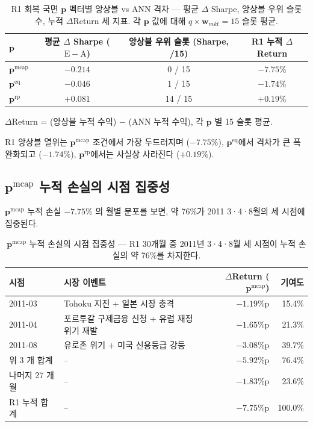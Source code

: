 \documentclass{article}
\begin{document}
\begin{table}[ht]
\centering
\caption{R1 회복 국면 $\mathbf{p}$ 벡터별 앙상블 vs ANN 격차 — 평균 $\Delta$ Sharpe,
앙상블 우위 슬롯 수, 누적 $\Delta$Return 세 지표.
각 $\mathbf{p}$ 값에 대해 $q \times \mathbf{w}_{mkt} = 15$ 슬롯 평균.}
\label{tab:r1_pmatrix_delta}
\setlength{\tabcolsep}{8pt}
\renewcommand{\arraystretch}{1.2}
\small
\begin{tabular}{lccc}
\toprule
$\mathbf{p}$ & 평균 $\Delta$ Sharpe ($\mathrm{E} - \mathrm{A}$) & 앙상블 우위 슬롯 (Sharpe, /15) & R1 누적 $\Delta$Return \\
\midrule
$\mathbf{p}^{\mathrm{mcap}}$ & $-0.214$ & 0 / 15  & $-7.75\%$ \\
$\mathbf{p}^{\mathrm{eq}}$   & $-0.046$ & 1 / 15  & $-1.74\%$ \\
$\mathbf{p}^{\mathrm{rp}}$   & $+0.081$ & 14 / 15 & $+0.19\%$ \\
\bottomrule
\end{tabular}
\par\smallskip
\footnotesize
\raggedright
$\Delta$Return = (앙상블 누적 수익) $-$ (ANN 누적 수익), 각 $\mathbf{p}$ 별 15 슬롯 평균.
\end{table}

R1 앙상블 열위는 $\mathbf{p}^{\mathrm{mcap}}$ 조건에서 가장 두드러지며 ($-7.75\%$), $\mathbf{p}^{\mathrm{eq}}$에서 격차가 큰 폭 완화되고 ($-1.74\%$), $\mathbf{p}^{\mathrm{rp}}$에서는 사실상 사라진다 ($+0.19\%$).

\subsection{$\mathbf{p}^{\mathrm{mcap}}$ 누적 손실의 시점 집중성}

$\mathbf{p}^{\mathrm{mcap}}$ 누적 손실 $-7.75\%$ 의 월별 분포를 보면, 약 76\%가 2011  3·4·8월의 세 시점에 집중된다.

\begin{table}[ht]
\centering
\caption{$\mathbf{p}^{\mathrm{mcap}}$ 누적 손실의 시점 집중성 — R1 30개월 중
2011년 3·4·8월 세 시점이 누적 손실의 약 76\%를 차지한다.}
\label{tab:r1_loss_concentration}
\setlength{\tabcolsep}{8pt}
\renewcommand{\arraystretch}{1.2}
\small
\begin{tabular}{llrr}
\toprule
시점 & 시장 이벤트 & $\Delta$Return ($\mathbf{p}^{\mathrm{mcap}}$) & 기여도 \\
\midrule
2011-03 & Tohoku 지진 + 일본 시장 충격              & $-1.19$\%p & 15.4\% \\
2011-04 & 포르투갈 구제금융 신청 + 유럽 재정위기 재발 & $-1.65$\%p & 21.3\% \\
2011-08 & 유로존 위기 + 미국 신용등급 강등           & $-3.08$\%p & 39.7\% \\
\midrule
위 3 개 합계 & --                                  & $-5.92$\%p & 76.4\% \\
나머지 27 개월 & --                                & $-1.83$\%p & 23.6\% \\
\midrule
R1 누적 합계 & --                                  & $-7.75$\%p & 100.0\% \\
\bottomrule
\end{tabular}
\end{table}
\end{document}
